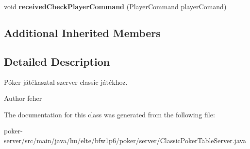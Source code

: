 \begin{DoxyCompactItemize}
\item 
\hypertarget{classhu_1_1elte_1_1bfw1p6_1_1poker_1_1server_1_1_classic_poker_table_server_aeae14d806d31102b76e45d29f9ae48b9}{}void {\bfseries received\+Check\+Player\+Command} (\hyperlink{classhu_1_1elte_1_1bfw1p6_1_1poker_1_1command_1_1_player_command}{Player\+Command} player\+Comand)\label{classhu_1_1elte_1_1bfw1p6_1_1poker_1_1server_1_1_classic_poker_table_server_aeae14d806d31102b76e45d29f9ae48b9}

\end{DoxyCompactItemize}
\subsection*{Additional Inherited Members}


\subsection{Detailed Description}
Póker játékasztal-\/szerver classic játékhoz. \begin{DoxyAuthor}{Author}
feher 
\end{DoxyAuthor}


The documentation for this class was generated from the following file\+:\begin{DoxyCompactItemize}
\item 
poker-\/server/src/main/java/hu/elte/bfw1p6/poker/server/Classic\+Poker\+Table\+Server.\+java\end{DoxyCompactItemize}

